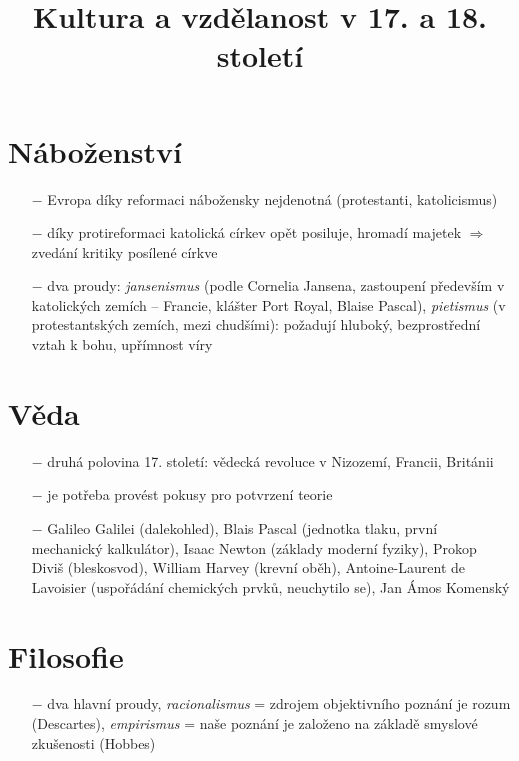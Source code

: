 \documentclass{article}
\title{\vspace{-2cm}Kultura a vzdělanost v 17. a 18. století\vspace{-1.7cm}}
\date{}
\author{}
\begin{document}
\maketitle

\section*{Náboženství}

\begin{itemize}
    \vspace{-0.5em}
    \setlength\itemsep{0.15em}
    \item[$-$] Evropa díky reformaci nábožensky nejdenotná (protestanti, katolicismus)
    \item[$-$] díky protireformaci katolická církev opět posiluje, hromadí majetek $\Rightarrow$ zvedání kritiky posílené církve
    \item[$-$] dva proudy: \textit{jansenismus} (podle Cornelia Jansena, zastoupení především v katolických zemích -- Francie, klášter Port Royal, Blaise Pascal), \textit{pietismus} (v protestantských zemích, mezi chudšími): požadují hluboký, bezprostřední vztah k bohu, upřímnost víry
\end{itemize}

\section*{Věda}
\begin{itemize}
    \vspace{-0.5em}
    \setlength\itemsep{0.15em}
    \item[$-$] druhá polovina 17. století: vědecká revoluce v Nizozemí, Francii, Británii
    \item[$-$] je potřeba provést pokusy pro potvrzení teorie
    \item[$-$] Galileo Galilei (dalekohled), Blais Pascal (jednotka tlaku, první mechanický kalkulátor), Isaac Newton (základy moderní fyziky), Prokop Diviš (bleskosvod), William Harvey (krevní oběh), Antoine-Laurent de Lavoisier (uspořádání chemických prvků, neuchytilo se), Jan Ámos Komenský
\end{itemize}

\section*{Filosofie}
\begin{itemize}
    \vspace{-0.5em}
    \setlength\itemsep{0.15em}
    \item[$-$] dva hlavní proudy, \textit{racionalismus} = zdrojem objektivního poznání je rozum (Descartes), \textit{empirismus} = naše poznání je založeno na základě smyslové zkušenosti (Hobbes)
\end{itemize}
\end{document}
